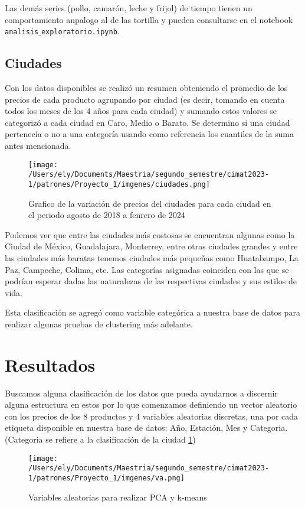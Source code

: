 \documentclass[letterpaper,spanish,reprint,nofootinbib,showkeys,aps]{revtex4-2}
\begin{document}
Las demás series (pollo, camarón, leche y frijol) de tiempo tienen un comportamiento anpalogo al de las tortilla y pueden consultarse en el notebook \texttt{analisis$\_$exploratorio.ipynb}.

\subsection*{Ciudades}

Con los datos disponibles se realizó un resumen obteniendo el promedio de los precios de cada producto agrupando por ciudad (es decir, tomando en cuenta todos los meses de los 4 años para cada ciudad) y sumando estos valores se categorizó a cada ciudad en Caro, Medio o Barato. Se determino si una ciudad pertenecía o no a una categoría usando como referencia los cuantiles de la suma antes mencionada. 

\begin{figure} [H]
	\begin{center}
		\texttt{[image: /Users/ely/Documents/Maestria/segundo\_semestre/cimat2023-1/patrones/Proyecto\_1/imgenes/ciudades.png]}
		\caption{Grafico de la variación de precios del ciudades para cada ciudad en el periodo agosto de 2018 a fenrero de 2024}
		\label{ciudades} 
   \end{center} 
\end{figure} 

Podemos ver que entre las ciudades más costosas se encuentran algunas como la Ciudad de México, Guadalajara, Monterrey, entre otras ciudades grandes y entre las ciudades más baratas tenemos ciudades más pequeñas como Huatabampo, La Paz, Campeche, Colima, etc. Las categorías asignadas coinciden con las que se podrían esperar dadas las naturalezas de las respectivas ciudades y sus estilos de vida.

Esta clasificación se agregó como variable categórica a nuestra base de datos para realizar algunas pruebas de clustering más adelante. 

\section{Resultados}

Buscamos alguna clasificación de los datos que pueda ayudarnos a discernir alguna estructura en estos por lo que comenzamos definiendo un vector aleatorio con los precios de los 8 productos y 4 variables aleatorias discretas, una por cada etiqueta disponible en nuestra base de datos: Año, Estación, Mes y Categoria. (Categoria se refiere a la clasificación de la ciudad \ref{ciudades})
\begin{figure} [H]
	\begin{center}
		\texttt{[image: /Users/ely/Documents/Maestria/segundo\_semestre/cimat2023-1/patrones/Proyecto\_1/imgenes/va.png]}
		\caption{Variables aleatorias para realizar PCA y k-means}
		\label{va} 
   \end{center} 
\end{figure} 
\end{document}
